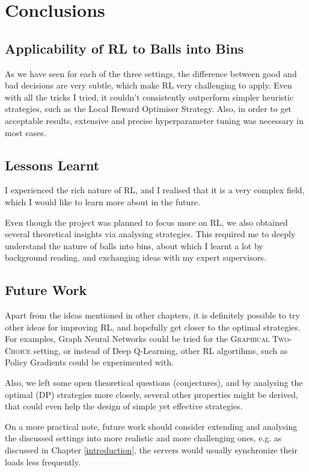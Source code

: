 
\chapter{Conclusions}\label{conclusion}

\ifpdf
    \graphicspath{{Chapter3/Figs/Raster/}{Chapter3/Figs/PDF/}{Chapter3/Figs/}}
\else
    \graphicspath{{Chapter3/Figs/Vector/}{Chapter3/Figs/}}
\fi



\section{Applicability of RL to Balls into Bins}

As we have seen for each of the three settings, the difference between good and bad decisions are very subtle, which make RL very challenging to apply. Even with all the tricks I tried, it couldn't consistently outperform simpler heuristic strategies, such as the Local Reward Optimiser Strategy. Also, in order to get acceptable results, extensive and precise hyperparameter tuning was necessary in most cases. 



\section{Lessons Learnt}

I experienced the rich nature of RL, and I realised that it is a very complex field, which I would like to learn more about in the future. 

Even though the project was planned to focus more on RL, we also obtained several theoretical insights via analysing strategies. This required me to deeply understand the nature of balls into bins, about which I learnt a lot by background reading, and exchanging ideas with my expert supervisors. 

\section{Future Work}

Apart from the ideas mentioned in other chapters, it is definitely possible to try other ideas for improving RL, and hopefully get closer to the optimal strategies. For examples, Graph Neural Networks could be tried for the \textsc{Graphical Two-Choice} setting, or instead of Deep Q-Learning, other RL algortihms, such as Policy Gradients could be experimented with. 


Also, we left some open theoretical questions (conjectures), and by analysing the optimal (DP) strategies more closely, several other properties might be derived, that could even help the design of simple yet effective strategies.


On a more practical note, future work should consider extending and analysing the discussed settings into more realistic and more challenging ones, e.g. as discussed in Chapter \ref{introduction}, the servers would usually synchronize their loads less frequently. 